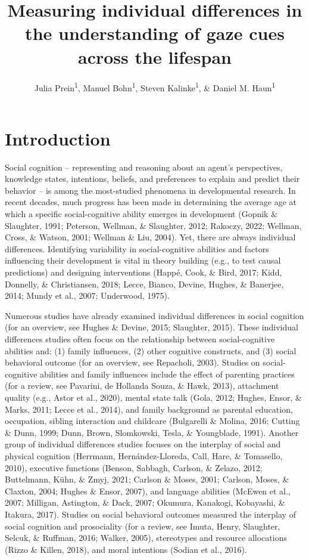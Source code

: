 \documentclass[
  man,floatsintext]{apa6}
\title{Measuring individual differences in the understanding of gaze cues across the lifespan}
\author{Julia Prein\textsuperscript{1}, Manuel Bohn\textsuperscript{1}, Steven Kalinke\textsuperscript{1}, \& Daniel M. Haun\textsuperscript{1}}
\date{}
\affiliation{\vspace{0.5cm}\textsuperscript{1} Department of Comparative Cultural Psychology, Max Planck Institute for Evolutionary Anthropology, Leipzig, Germany}
\begin{document}
\maketitle

\hypertarget{introduction}{%
\section{Introduction}\label{introduction}}

Social cognition -- representing and reasoning about an agent's perspectives, knowledge states, intentions, beliefs, and preferences to explain and predict their behavior -- is among the most-studied phenomena in developmental research.
In recent decades, much progress has been made in determining the average age at which a specific social-cognitive ability emerges in development (Gopnik \& Slaughter, 1991; Peterson, Wellman, \& Slaughter, 2012; Rakoczy, 2022; Wellman, Cross, \& Watson, 2001; Wellman \& Liu, 2004). Yet, there are always individual differences. Identifying variability in social-cognitive abilities and factors influencing their development is vital in theory building (e.g., to test causal predictions) and designing interventions (Happé, Cook, \& Bird, 2017; Kidd, Donnelly, \& Christiansen, 2018; Lecce, Bianco, Devine, Hughes, \& Banerjee, 2014; Mundy et al., 2007; Underwood, 1975).

Numerous studies have already examined individual differences in social cognition (for an overview, see Hughes \& Devine, 2015; Slaughter, 2015). These individual differences studies often focus on the relationship between social-cognitive abilities and: (1) family influences, (2) other cognitive constructs, and (3) social behavioral outcome (for an overview, see Repacholi, 2003). Studies on social-cognitive abilities and family influences include the effect of parenting practices (for a review, see Pavarini, de Hollanda Souza, \& Hawk, 2013), attachment quality (e.g., Astor et al., 2020), mental state talk (Gola, 2012; Hughes, Ensor, \& Marks, 2011; Lecce et al., 2014), and family background as parental education, occupation, sibling interaction and childcare (Bulgarelli \& Molina, 2016; Cutting \& Dunn, 1999; Dunn, Brown, Slomkowski, Tesla, \& Youngblade, 1991). Another group of individual differences studies focuses on the interplay of social and physical cognition (Herrmann, Hernández-Lloreda, Call, Hare, \& Tomasello, 2010), executive functions (Benson, Sabbagh, Carlson, \& Zelazo, 2012; Buttelmann, Kühn, \& Zmyj, 2021; Carlson \& Moses, 2001; Carlson, Moses, \& Claxton, 2004; Hughes \& Ensor, 2007), and language abilities (McEwen et al., 2007; Milligan, Astington, \& Dack, 2007; Okumura, Kanakogi, Kobayashi, \& Itakura, 2017). Studies on social behavioral outcomes measured the interplay of social cognition and prosociality (for a review, see Imuta, Henry, Slaughter, Selcuk, \& Ruffman, 2016; Walker, 2005), stereotypes and resource allocations (Rizzo \& Killen, 2018), and moral intentions (Sodian et al., 2016).
\end{document}
